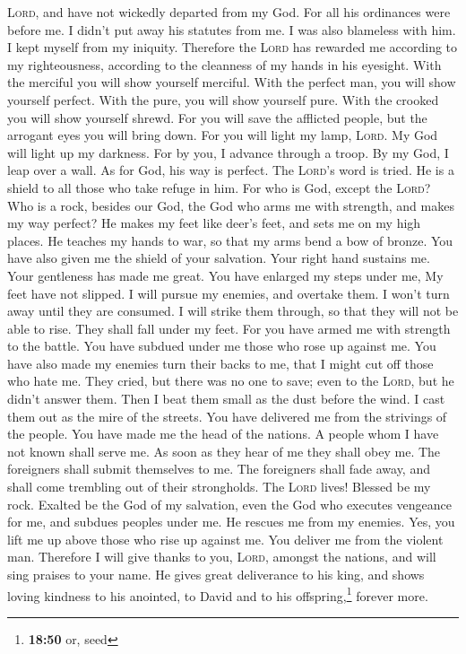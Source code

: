 \textsc{Lord}, and have not wickedly departed from my God.
 For all his ordinances were before me. I didn't put away
his statutes from me.  I was also blameless with him. I
kept myself from my iniquity.  Therefore the
\textsc{Lord} has rewarded me according to my righteousness, according
to the cleanness of my hands in his eyesight.  With the
merciful you will show yourself merciful. With the perfect man, you will
show yourself perfect.  With the pure, you will show
yourself pure. With the crooked you will show yourself shrewd.
 For you will save the afflicted people, but the arrogant
eyes you will bring down.  For you will light my lamp,
\textsc{Lord}. My God will light up my darkness.  For by
you, I advance through a troop. By my God, I leap over a wall.
 As for God, his way is perfect. The \textsc{Lord}'s word
is tried. He is a shield to all those who take refuge in him.
 For who is God, except the \textsc{Lord}? Who is a rock,
besides our God,  the God who arms me with strength, and
makes my way perfect?  He makes my feet like deer's feet,
and sets me on my high places.  He teaches my hands to
war, so that my arms bend a bow of bronze.  You have also
given me the shield of your salvation. Your right hand sustains me. Your
gentleness has made me great.  You have enlarged my steps
under me, My feet have not slipped.  I will pursue my
enemies, and overtake them. I won't turn away until they are consumed.
 I will strike them through, so that they will not be
able to rise. They shall fall under my feet.  For you
have armed me with strength to the battle. You have subdued under me
those who rose up against me.  You have also made my
enemies turn their backs to me, that I might cut off those who hate me.
 They cried, but there was no one to save; even to the
\textsc{Lord}, but he didn't answer them.  Then I beat
them small as the dust before the wind. I cast them out as the mire of
the streets.  You have delivered me from the strivings of
the people. You have made me the head of the nations. A people whom I
have not known shall serve me.  As soon as they hear of
me they shall obey me. The foreigners shall submit themselves to me.
 The foreigners shall fade away, and shall come trembling
out of their strongholds.  The \textsc{Lord} lives!
Blessed be my rock. Exalted be the God of my salvation, 
even the God who executes vengeance for me, and subdues peoples under
me.  He rescues me from my enemies. Yes, you lift me up
above those who rise up against me. You deliver me from the violent man.
 Therefore I will give thanks to you, \textsc{Lord},
amongst the nations, and will sing praises to your name. 
He gives great deliverance to his king, and shows loving kindness to his
anointed, to David and to his offspring,\footnote{\textbf{18:50} or,
  seed} forever more.

